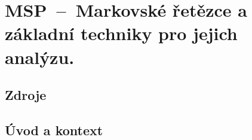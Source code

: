 

\graphicspath{{msp/markovske_retezce/figures}}


\chapter{MSP~--~Markovské řetězce a základní techniky pro jejich analýzu.}


\section{Zdroje}

\begin{compactitem}
    \item {}
    \item {}
\end{compactitem}


\section{Úvod a kontext}
